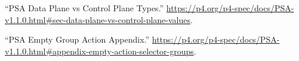 \documentclass[11pt]{article}
\begin{document}
{{\begin{thebibliography}{36}
\mdbibitemlabel{{}[23]}\textquotedblleft{}PSA Data Plane vs Control Plane Types.\textquotedblright{} \href{https://p4.org/p4-spec/docs/PSA-v1.1.0.html\%23sec-data-plane-vs-control-plane-values}{{\ttfamily https://\hspace{0pt}p4.\hspace{0pt}org/\hspace{0pt}p4-\hspace{0pt}spec/\hspace{0pt}docs/\hspace{0pt}PSA-\hspace{0pt}v1.\hspace{0pt}1.\hspace{0pt}0.\hspace{0pt}html\#\hspace{0pt}sec-\hspace{0pt}data-\hspace{0pt}plane-\hspace{0pt}vs-\hspace{0pt}control-\hspace{0pt}plane-\hspace{0pt}values}}.\label{psatranslation}%

\mdbibitemlabel{{}[24]}\textquotedblleft{}PSA Empty Group Action Appendix.\textquotedblright{} \href{https://p4.org/p4-spec/docs/PSA-v1.1.0.html\%23appendix-empty-action-selector-groups}{{\ttfamily https://\hspace{0pt}p4.\hspace{0pt}org/\hspace{0pt}p4-\hspace{0pt}spec/\hspace{0pt}docs/\hspace{0pt}PSA-\hspace{0pt}v1.\hspace{0pt}1.\hspace{0pt}0.\hspace{0pt}html\#\hspace{0pt}appendix-\hspace{0pt}empty-\hspace{0pt}action-\hspace{0pt}selector-\hspace{0pt}groups}}.\label{psaemptygroupactionappendix}%


\end{thebibliography}}}
\end{document}
